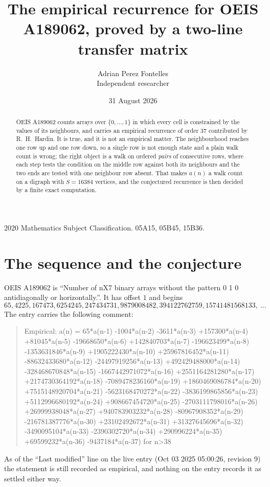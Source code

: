 \documentclass[11pt,a4paper]{article}
\title{The empirical recurrence for OEIS A189062, proved by a two-line transfer matrix}
\author{Adrian Perez Fontelles\\ \small Independent researcher}
\date{31 August 2026}
\theoremstyle{plain}
\theoremstyle{definition}
\begin{document}
\maketitle

\begin{abstract}
OEIS A189062 counts arrays over $\{0,\dots,1\}$ in which every cell is constrained by the
values of its neighbours, and carries an empirical recurrence of order $37$ contributed
by R.~H.~Hardin. It is true, and it is not an empirical matter. The neighbourhood reaches one
row up and one row down, so a single row is not enough state and a plain walk count
is wrong; the right object is a walk on ordered \emph{pairs} of consecutive rows, where
each step tests the condition on the middle row against both its neighbours and the two
ends are tested with one neighbour row absent. That makes $a(n)$ a walk count on a digraph
with $S=16384$ vertices, and the conjectured recurrence is then decided by a finite exact
computation.
\end{abstract}

\noindent\small 2020 Mathematics Subject Classification. 05A15, 05B45, 15B36.\normalsize

\section{The sequence and the conjecture}

OEIS A189062 is ``Number of nX7 binary arrays without the pattern 0 1 0 antidiagonally or horizontally.''. It has offset $1$ and begins
\[
65, 4225, 167473, 6254245, 247434731, 9879008482, 394122762759, 15741481568133,\ \dots
\]
The entry carries the following comment:
\begin{quote}\small
Empirical: a(n) = 65*a(n-1) -1004*a(n-2) -3611*a(n-3) +157300*a(n-4) +81045*a(n-5) -19668650*a(n-6) +142840703*a(n-7) -196623499*a(n-8) -1353631846*a(n-9) +1905222430*a(n-10) +25967816452*a(n-11) -88632433680*a(n-12) -24497919256*a(n-13) +492429488000*a(n-14) -328468670848*a(n-15) -1667442971072*a(n-16) +2551164281280*a(n-17) +2174730364192*a(n-18) -7089478236160*a(n-19) +1860469086784*a(n-20) +7515148920704*a(n-21) -5623168470272*a(n-22) -3836199865856*a(n-23) +5112996680192*a(n-24) +908667454720*a(n-25) -2703111798016*a(n-26) +26999938048*a(n-27) +940783903232*a(n-28) -80967908352*a(n-29) -216781387776*a(n-30) +23102492672*a(n-31) +31327645696*a(n-32) -3490095104*a(n-33) -2390302720*a(n-34) +290996224*a(n-35) +69599232*a(n-36) -9437184*a(n-37) for n>38
\end{quote}
As of the ``Last modified'' line on the live entry (Oct 03 2025 05:00:26, revision 9) the statement is
still recorded as empirical, and nothing on the entry records it as settled either way.
\end{document}
